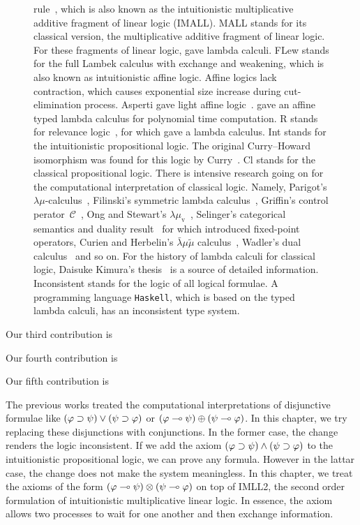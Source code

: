 \begin{figure}
{  rule~\citep[p.86]{residuated}, which is also known as the
  intuitionistic
  multiplicative additive fragment of linear logic (IMALL).
  \textsf{MALL} stands for its classical version, the multiplicative
  additive fragment of linear logic.  For these fragments of linear
  logic,
  \citet{abramsky1993computational} gave lambda calculi.
  \textsf{FLew} stands for the full Lambek calculus with exchange and
  weakening,
  which is also known as intuitionistic affine logic.
  Affine logics lack contraction, which causes exponential size increase
  during cut-elimination process.
  Asperti gave light affine logic~\citep{2002}.
  \citet{terui2007} gave an affine typed lambda calculus for polynomial
  time computation.
  \textsf{R} stands for relevance logic~\citep{urquhart1972},
  for which \citet{gabbay1992} gave a lambda calculus.
  \textsf{Int} stands for the intuitionistic propositional logic.
  The original Curry--Howard isomorphism was found for this logic by
  Curry~\citep{curry1942}.
  \textsf{Cl} stands for the classical propositional logic.
  There is intensive research going on for the computational
  interpretation of classical logic.  Namely,
  Parigot's $\lambda\mu$-calculus~\citep{lambdamu},
  Filinski's symmetric lambda calculus~\citep{filinski1989},
  Griffin's control perator~$\mathcal C$~\citep{griffin1990},
  Ong and Stewart's $\lambda\mu_{\mathrm
  v}$~\citep{ong-stewart},
  Selinger's categorical semantics and duality
  result~\citep{selinger2001} for which \citet{kakutani2002} introduced
  fixed-point
  operators,
  Curien and Herbelin's $\bar\lambda\mu\tilde\mu$
  calculus~\citep{curien2000},
  Wadler's dual calculus~\citep{wadler-dual, wadler-reloaded} and so on.
  For the history of lambda calculi for classical logic,
  Daisuke Kimura's thesis~\cite{kimura} is a source of detailed
  information.
  \textsf{Inconsistent} stands for the logic of all logical formulae.
  A programming language \texttt{Haskell}, which is based on
  the typed lambda calculi, has
  an inconsistent type system.
  }
  \label{fig:lattice}
 \end{figure}

Our third contribution is

Our fourth contribution is

Our fifth contribution is

The previous works treated the computational interpretations of
disjunctive formulae like $(\varphi\supset\psi)\lor(\psi\supset\varphi)$ or
$(\varphi\multimap\psi)\oplus(\psi\multimap\varphi)$.  In this chapter, we try
replacing these disjunctions with conjunctions.
In the former case, the change renders the logic inconsistent.
If we add the axiom $(\varphi\supset\psi)\land(\psi\supset\varphi)$ to the
intuitionistic propositional logic,
we can prove any formula.  However in the lattar case, the change does
not make the system meaningless.
In this chapter, we treat
the axioms of the form $(\varphi\multimap\psi)\otimes(\psi\multimap\varphi)$
on top of IMLL2, the second order formulation of intuitionistic
multiplicative linear
logic.  In essence, the axiom allows two processes to wait for one
another and then exchange information.


